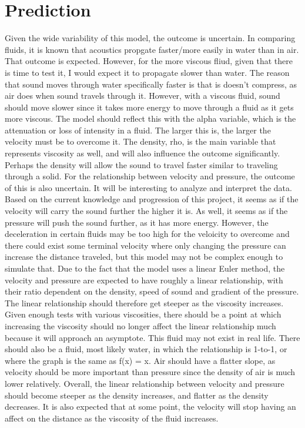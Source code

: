 \documentclass{article}
\begin{document}
\section{Prediction}

Given the wide variability of this model, the outcome is uncertain. In comparing fluids, it is known
that acoustics propgate faster/more easily in water than in air. That outcome is expected. However, for the
more viscous fliud, given that there is time to test it, I would expect it to propagate slower than water.
The reason that sound moves through water specifically faster is that is doesn't compress, as air does
when sound travels through it. However, with a viscous fluid, sound should move slower since it takes
more energy to move through a fluid as it gets more viscous. The model should reflect this with the 
alpha variable, which is the attenuation or loss of intensity in a fluid. The larger this is, the
larger the velocity must be to overcome it. The density, rho, is the main variable that represents
viscosity as well, and will also influence the outcome significantly. Perhaps the density will allow
the sound to travel faster similar to traveling through a solid. 
For the relationship between velocity and pressure, the outcome of this is also uncertain. It will be
interesting to analyze and interpret the data. Based on the current knowledge and progression of this
project, it seems as if the velocity will carry the sound further the higher it is. As well, it 
seems as if the pressure will push the sound further, as it has more energy. However, the deceleration in
certain fluids may be too high for the veloicity to overcome and there could exist some terminal velocity
where only changing the pressure can increase the distance traveled, but this model may not be complex enough
to simulate that. 
Due to the fact that the model uses a linear Euler method, the velocity and pressure are expected to have
roughly a linear relationship, with their ratio dependent on the density, speed of sound and gradient
of the pressure. The linear relationship should therefore get steeper as the viscosity increases. 
Given enough tests with various viscosities, there should be a point at which increasing the viscosity
should no longer affect the linear relationship much because it will approach an asymptote. This fluid
may not exist in real life. There should also be a fluid, most likely water, in which the relationship
is 1-to-1, or where the graph is the same as f(x) = x. Air should have a flatter slope, as velocity
should be more important than pressure since the density of air is much lower relatively. 
Overall, the linear relationship between velocity and pressure should become steeper as the density
increases, and flatter as the density decreases. It is also expected that at some point, the velocity
will stop having an affect on the distance as the viscosity of the fluid increases.
\end{document}
